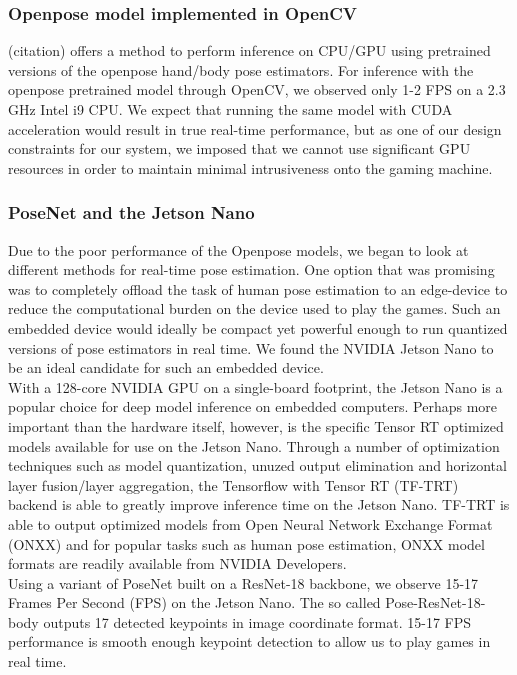 \documentclass[10pt,twocolumn,letterpaper]{article}
\begin{document}
\subsubsection{Openpose model implemented in OpenCV}
(citation) offers a method to perform inference on CPU/GPU using pretrained versions of the 
openpose hand/body pose estimators. For inference with the openpose pretrained model through 
OpenCV, we observed only 1-2 FPS on a 2.3 GHz Intel i9 CPU. We expect that running the same model 
with CUDA acceleration would result in true real-time performance, but as one of our design 
constraints for our system, we imposed that we cannot use significant GPU resources in order to 
maintain minimal intrusiveness onto the gaming machine.

\subsubsection{PoseNet and the Jetson Nano}
Due to the poor performance of the Openpose models, we began to look at different methods for 
real-time pose estimation. One option that was promising was to completely offload the task of 
human pose estimation to an edge-device to reduce the computational burden on the device used 
to play the games. Such an embedded device would ideally be compact yet powerful enough to run 
quantized versions of pose estimators in real time. We found the NVIDIA Jetson Nano to be an 
ideal candidate for such an embedded device.\\

With a 128-core NVIDIA GPU on a single-board footprint, the Jetson Nano is a popular 
choice for deep model inference on embedded computers. Perhaps more important than the hardware 
itself, however, is the specific Tensor RT optimized models available for use on the Jetson Nano. 
Through a number of optimization techniques such as model quantization, unuzed output elimination 
and horizontal layer fusion/layer aggregation, the Tensorflow with Tensor RT (TF-TRT) backend is 
able to greatly improve inference time on the Jetson Nano. TF-TRT is able to output optimized 
models from Open Neural Network Exchange Format (ONXX) and for popular tasks such as human pose 
estimation, ONXX model formats are readily available from NVIDIA Developers.\\

Using a variant of PoseNet built on a ResNet-18 backbone, we observe 15-17 Frames Per Second 
(FPS) on the Jetson Nano. The so called Pose-ResNet-18-body outputs 17 detected keypoints in 
image coordinate format. 15-17 FPS performance is smooth enough keypoint detection to allow us to 
play games in real time.
\end{document}

